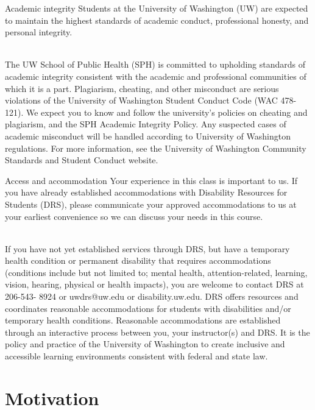 \documentclass[10pt,t]{beamer}
\begin{document}
\begin{frame}{Academic integrity}
Students at the University of Washington (UW) are expected to maintain the highest standards of academic conduct, professional honesty, and personal integrity.
 \\~\

The UW School of Public Health (SPH) is committed to upholding standards of academic integrity consistent with the academic and professional communities of which it is a part. Plagiarism, cheating, and other misconduct are serious violations of the University of Washington Student Conduct Code (WAC 478-121). We expect you to know and follow the university’s policies on cheating and plagiarism, and the SPH Academic Integrity Policy. Any suspected cases of academic misconduct will be handled according to University of Washington regulations. For more information, see the University of Washington Community Standards and Student Conduct website.

\end{frame}

\begin{frame}{Access and accommodation}
\small Your experience in this class is important to us. If you have already established accommodations with Disability Resources for Students (DRS), please communicate your approved accommodations to us at your earliest convenience so we can discuss your needs in this course.
\\~\

\small If you have not yet established services through DRS, but have a temporary health condition or permanent disability that requires accommodations (conditions include but not limited to; mental health, attention-related, learning, vision, hearing, physical or health impacts), you are welcome to contact DRS at 206-543- 8924 or uwdrs@uw.edu or disability.uw.edu. DRS offers resources and coordinates reasonable accommodations for students with disabilities and/or temporary health conditions. Reasonable accommodations are established through an interactive process between you, your instructor(s) and DRS. It is the policy and practice of the University of Washington to create inclusive and accessible learning environments consistent with federal and state law.

\end{frame}

\section{Motivation}
\end{document}
